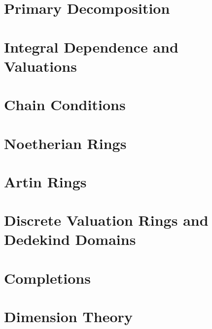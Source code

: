 \chapter{Primary Decomposition}
\label{am-ch4}

\chapter{Integral Dependence and Valuations}
\label{am-ch5}

\chapter{Chain Conditions}
\label{am-ch6}

\chapter{Noetherian Rings}
\label{am-ch7}

\chapter{Artin Rings}
\label{am-ch8}

\chapter{Discrete Valuation Rings and Dedekind Domains}
\label{am-ch9}

\chapter{Completions}
\label{am-ch10}

\chapter{Dimension Theory}
\label{am-ch11}

